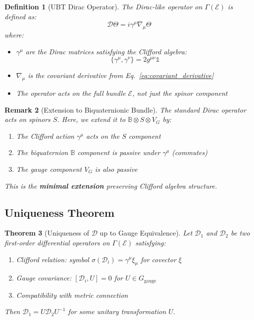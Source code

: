 \documentclass[12pt]{article}
\newtheorem{definition}{Definition}[section]
\newtheorem{theorem}[definition]{Theorem}
\newtheorem{remark}[definition]{Remark}
\newcommand{\B}{\mathbb{B}}
\begin{document}
\begin{definition}[UBT Dirac Operator]
\label{def:dirac_operator}
The Dirac-like operator on $\Gamma(\mathcal{E})$ is defined as:
\begin{equation}
\mathcal{D} \Theta = i \gamma^\mu \nabla_\mu \Theta
\label{eq:dirac_operator}
\end{equation}
where:
\begin{itemize}
    \item $\gamma^\mu$ are the Dirac matrices satisfying the Clifford algebra:
    \begin{equation}
    \{\gamma^\mu, \gamma^\nu\} = 2 g^{\mu\nu} \mathbb{1}
    \end{equation}
    \item $\nabla_\mu$ is the covariant derivative from Eq.~\eqref{eq:covariant_derivative}
    \item The operator acts on the full bundle $\mathcal{E}$, not just the spinor component
\end{itemize}
\end{definition}

\begin{remark}[Extension to Biquaternionic Bundle]
The standard Dirac operator acts on spinors $S$. Here, we extend it to $\B \otimes S \otimes V_G$ by:
\begin{enumerate}
    \item The Clifford action $\gamma^\mu$ acts on the $S$ component
    \item The biquaternion $\B$ component is passive under $\gamma^\mu$ (commutes)
    \item The gauge component $V_G$ is also passive
\end{enumerate}
This is the \textbf{minimal extension} preserving Clifford algebra structure.
\end{remark}

\subsection{Uniqueness Theorem}

\begin{theorem}[Uniqueness of $\mathcal{D}$ up to Gauge Equivalence]
\label{thm:uniqueness}
Let $\mathcal{D}_1$ and $\mathcal{D}_2$ be two first-order differential operators on $\Gamma(\mathcal{E})$ satisfying:
\begin{enumerate}
    \item Clifford relation: symbol $\sigma(\mathcal{D}_i) = \gamma^\mu \xi_\mu$ for covector $\xi$
    \item Gauge covariance: $[\mathcal{D}_i, U] = 0$ for $U \in G_{\text{gauge}}$
    \item Compatibility with metric connection
\end{enumerate}
Then $\mathcal{D}_1 = U \mathcal{D}_2 U^{-1}$ for some unitary transformation $U$.
\end{theorem}
\end{document}
